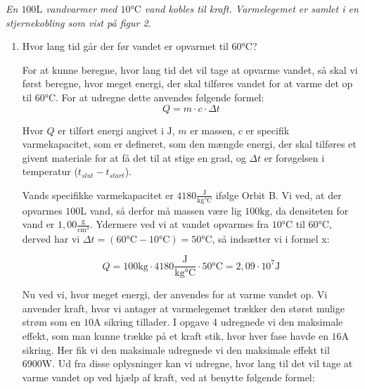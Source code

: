 \documentclass[a4paper, 12pt]{article}
\begin{document}
\textit{En \(100 \textrm{L}\) vandvarmer med \(10 \si{\celsius}\) vand kobles til kraft. Varmelegemet er samlet i en stjernekobling som vist på figur 2.} 
\begin{enumerate}[\textbf{a.}]
	\item Hvor lang tid går der før vandet er opvarmet til \(60 \si{\celsius}\)? \newline

	      For at kunne beregne, hvor lang tid det vil tage at opvarme vandet, så skal vi først beregne, hvor meget energi, der skal tilføres vandet for at varme det op til \(60 \si{\celsius}\). For at udregne dette anvendes følgende formel:
	      \begin{equation*}
	      	Q=m \cdot c \cdot \Delta t
	      \end{equation*}
	      
	      Hvor \(Q\) er tilført energi angivet i \(\si{\joule}\), \(m\) er massen, \(c\) er specifik varmekapacitet, som er defineret, som den mængde energi, der skal tilføres et givent materiale for at få det til at stige en grad, og \(\Delta t\) er forøgelsen i temperatur (\(t_{slut}-t_{start}\)). \newline
	      
	      Vands specifikke varmekapacitet er \(4180 \frac{\si{\joule}}{\si{\kilogram} \si{\celsius}}\) ifølge Orbit B. Vi ved, at der opvarmes \(100 \textrm{L}\) vand, så derfor må massen være lig \(100 \si{\kilogram}\), da densiteten for vand er \(1,00 \frac{\si{\gram}}{\textrm{cm}^{3}}\). Ydermere ved vi at vandet opvarmes fra \(10 \si{\celsius}\) til \(60 \si{\celsius}\), derved har vi \(\Delta t = (60 \si{\celsius} - 10 \si{\celsius}) = 50 \si{\celsius}\), så indsætter vi i formel x:
	      
	      \begin{equation*}
	      	Q= 100 \si{\kilogram} \cdot 4180 \frac{\si{\joule}}{\si{\kilogram}  \si{\celsius}} \cdot 50 \si{\celsius} = 2,09 \cdot 10^{7} \si{\joule}
	      \end{equation*}
	      
	      Nu ved vi, hvor meget energi, der anvendes for at varme vandet op. Vi anvender kraft, hvor vi antager at varmelegemet trækker den størst mulige strøm som en \(10 \si{\ampere}\) sikring tillader. I opgave 4 udregnede vi den maksimale effekt, som man kunne trække på et kraft stik, hvor hver fase havde en \(16 \si{\ampere}\) sikring. Her fik vi den maksimale udregnede vi den maksimale effekt til \(6900 \si{\watt}\). Ud fra disse oplysninger kan vi udregne, hvor lang til det vil tage at varme vandet op ved hjælp af kraft, ved at benytte følgende formel:
	      

\end{enumerate}
\end{document}
